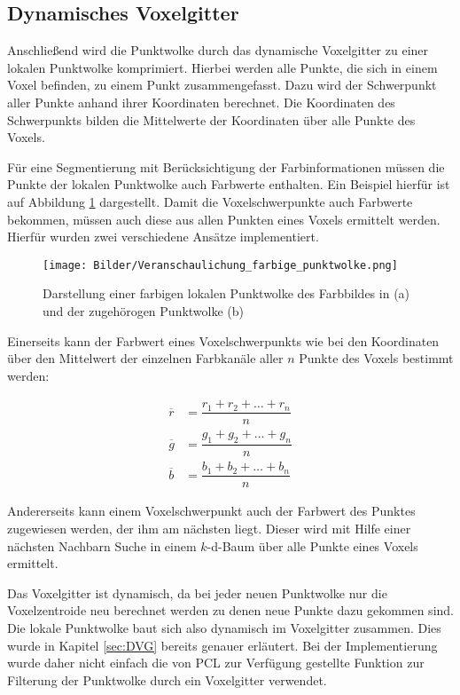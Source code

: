 \subsection[Dynamisches Voxelgitter (Kopp)]{Dynamisches Voxelgitter}
\label{sec:RGB-DVG}

Anschließend wird die Punktwolke durch das dynamische Voxelgitter zu einer lokalen Punktwolke komprimiert. Hierbei werden alle Punkte, die sich in einem Voxel befinden, zu einem Punkt zusammengefasst. Dazu wird der Schwerpunkt aller Punkte anhand ihrer Koordinaten berechnet. Die Koordinaten des Schwerpunkts bilden die Mittelwerte der Koordinaten über alle Punkte des Voxels.

Für eine Segmentierung mit Berücksichtigung der Farbinformationen müssen die Punkte der lokalen Punktwolke auch Farbwerte enthalten. Ein Beispiel hierfür ist auf Abbildung \ref{fig:DVG} dargestellt. Damit die Voxelschwerpunkte auch Farbwerte bekommen, müssen auch diese aus allen Punkten eines Voxels ermittelt werden. Hierfür wurden zwei verschiedene Ansätze implementiert.

\begin{figure}
	\centering
	\texttt{[image: Bilder/Veranschaulichung\_farbige\_punktwolke.png]}
	\caption{Darstellung einer farbigen lokalen Punktwolke des Farbbildes in (a) und der zugehörogen Punktwolke (b) }
	\label{fig:DVG}
\end{figure}

Einerseits kann der Farbwert eines Voxelschwerpunkts wie bei den Koordinaten über den Mittelwert der einzelnen Farbkanäle aller $n$ Punkte des Voxels bestimmt werden:

\begin{equation}
\label{equ:Mittelwert_Farbkanäle}
	\begin{split}
		\overline{r} &= \dfrac{r_1 + r_2 + \ldots + r_n}{n} \\
		\overline{g} &= \dfrac{g_1 + g_2 + \ldots + g_n}{n} \\
		\overline{b} &= \dfrac{b_1 + b_2 + \ldots + b_n}{n}
	\end{split}
\end{equation}

Andererseits kann einem Voxelschwerpunkt auch der Farbwert des Punktes zu\-ge\-wie\-sen werden, der ihm am nächsten liegt. Dieser wird mit Hilfe einer nächsten Nachbarn Suche in einem $k$-d-Baum über alle Punkte eines Voxels ermittelt. 

Das Voxelgitter ist dynamisch, da bei jeder neuen Punktwolke nur die Voxelzentroide neu berechnet werden zu denen neue Punkte dazu gekommen sind. Die lokale Punkt\-wol\-ke baut sich also dynamisch im Voxelgitter zusammen. Dies wurde in Kapitel \ref{sec:DVG} bereits genauer erläutert. Bei der Implementierung wurde daher nicht einfach die von PCL zur Verfügung gestellte Funktion zur Filterung der Punktwolke durch ein Voxelgitter verwendet. 

